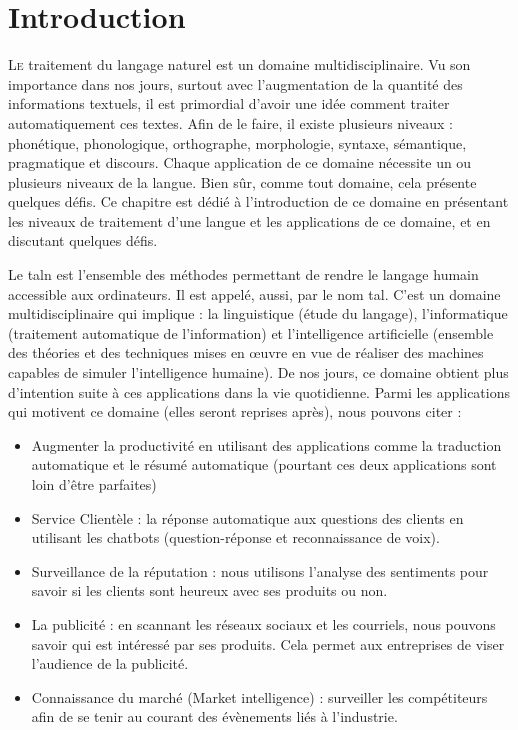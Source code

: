 \documentclass{KodeBook}
\begin{document}
		\mainmatter
	
\fi
\chapter{Introduction}

\begin{introduction}
	\lettrine{L}{e} traitement du langage naturel est un domaine multidisciplinaire. 
	Vu son importance dans nos jours, surtout avec l'augmentation de la quantité des informations textuels, il est primordial d'avoir une idée comment traiter automatiquement ces textes. 
	Afin de le faire, il existe plusieurs niveaux : phonétique, phonologique, orthographe, morphologie, syntaxe, sémantique, pragmatique et discours. 
	Chaque application de ce domaine nécessite un ou plusieurs niveaux de la langue. 
	Bien sûr, comme tout domaine, cela présente quelques défis. 
	Ce chapitre est dédié à l'introduction de ce domaine en présentant les niveaux de traitement d'une langue et les applications de ce domaine, et en discutant quelques défis.
\end{introduction} 

Le \ac{taln} est l'ensemble des méthodes permettant de rendre le langage humain accessible aux ordinateurs.
Il est appelé, aussi, par le nom \ac{tal}. 
C'est un domaine multidisciplinaire qui implique : la linguistique (étude du langage), l'informatique (traitement automatique de l'information) et l'intelligence artificielle (ensemble des théories et des techniques mises en œuvre en vue de réaliser des machines capables de simuler l'intelligence humaine).
De nos jours, ce domaine obtient plus d'intention suite à ces applications dans la vie quotidienne. 
Parmi les applications qui motivent ce domaine (elles seront reprises après), nous pouvons citer :
\begin{itemize}
	\item Augmenter la productivité en utilisant des applications comme la traduction automatique et le résumé automatique (pourtant ces deux applications sont loin d'être parfaites)
	
	\item Service Clientèle : la réponse automatique aux questions des clients en utilisant les chatbots (question-réponse et reconnaissance de voix). 
	
	\item Surveillance de la réputation : nous utilisons l'analyse des sentiments pour savoir si les clients sont heureux avec ses produits ou non. 
	
	\item La publicité : en scannant les réseaux sociaux et les courriels, nous pouvons savoir qui est intéressé par ses produits. Cela permet aux entreprises de viser l'audience de la publicité. 
	
	\item Connaissance du marché (Market intelligence) : surveiller les compétiteurs afin de se tenir au courant des évènements liés à l'industrie.
\end{itemize}
\end{document}
